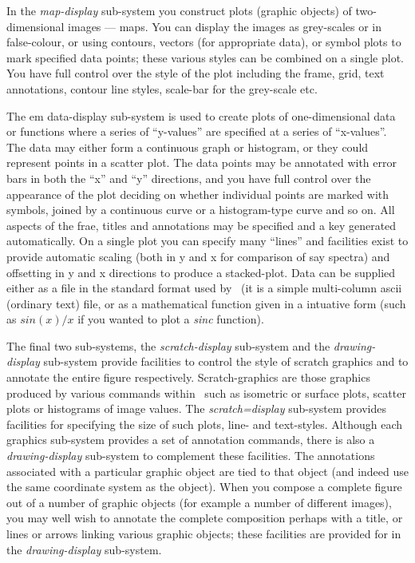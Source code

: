 In the {\em map-display} sub-system you construct plots (graphic objects)
of two-dimensional images --- maps.  You can display the images as 
grey-scales or in false-colour, or using contours, 
vectors (for appropriate data), or symbol plots to mark specified 
data points; these various styles can be combined on a single plot.
You have full control over the style of the plot including the frame,
grid, text annotations, contour line styles, scale-bar for the grey-scale
etc.

The {em data-display} sub-system is used to create plots of 
one-dimensional data or functions where a series of ``y-values''
are specified at a series of ``x-values''.  The data may either
form a continuous graph or histogram, or they could represent points
in a scatter plot.  The data points may be annotated with error bars
in both the ``x'' and ``y'' directions, and you have full control over
the appearance of the plot deciding on whether individual points are
marked with symbols, joined by a continuous curve or a histogram-type
curve and so on.  All aspects of the frae, titles and annotations may
be specified and a key generated automatically.  On a single plot
you can specify many ``lines'' and facilities exist to provide automatic
scaling (both in y and x for comparison of say spectra) and offsetting
in y and x directions to produce a stacked-plot.  Data can be supplied
either as a file in the standard format used by \Anmap\ (it is a simple
multi-column ascii (ordinary text) file, or as a mathematical
function given in a intuative form (such as $sin(x)/x$ if you wanted to
plot a {\em sinc} function).  

The final two sub-systems, the {\em scratch-display} sub-system and 
the {\em drawing-display} sub-system provide facilities to control
the style of scratch graphics and to annotate the entire figure 
respectively.  Scratch-graphics are those graphics produced by 
various commands within \Anmap\ such as isometric or surface plots,
scatter plots or histograms of image values.  The {\em scratch=display}
sub-system provides facilities for specifying the size of such plots,
line- and text-styles.  Although each graphics sub-system provides
a set of annotation commands, there is also a {\em drawing-display}
sub-system to complement these facilities.  The annotations associated
with a particular graphic object are tied to that object (and indeed
use the same coordinate system as the object).  When you compose
a complete figure out of a number of graphic objects (for example a
number of different images), you may well wish to annotate the complete
composition perhaps with a title, or lines or arrows linking
various graphic objects; these facilities are provided for in the
{\em drawing-display} sub-system.

